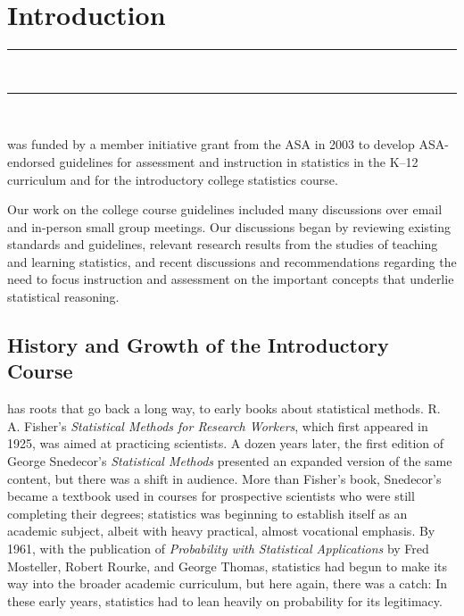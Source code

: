 
\mainmatter
\blankpage

\chapter{Introduction}
\vspace{-.53in}
   \noindent\color{graylight}\rule[0cm]{3.25in}{0.03cm} \\
    \noindent\color{graylight}\rule[0.4cm]{3.25in}{0.03cm} \\
\color{black}
\vspace{.05in}

 was funded by a member initiative grant from the ASA in 2003 to develop ASA-endorsed guidelines for assessment and instruction in statistics in the K--12 curriculum and for the introductory college statistics course.   

Our work on the college course guidelines included many discussions over email and in-person small group meetings.  Our discussions began by reviewing existing standards and guidelines, relevant research results from the studies of teaching and learning statistics, and recent discussions and recommendations regarding the need to focus instruction and assessment on the important concepts that underlie statistical reasoning.

\section{\textbf{History and Growth of the Introductory Course}}
 has roots that go back a long way, to early books about statistical methods.  R. A. Fisher's \textit{Statistical Methods for Research Workers}, which first appeared in 1925, was aimed at practicing scientists.  A dozen years later, the first edition of George Snedecor's \textit{Statistical Methods} presented an expanded version of the same content, but there was a shift in audience.  More than Fisher's book, Snedecor's became a textbook used in courses for prospective scientists who were still completing their degrees; statistics was beginning to establish itself as an academic subject, albeit with heavy practical, almost vocational emphasis.  By 1961, with the publication of \textit{Probability with Statistical Applications} by Fred Mosteller, Robert Rourke, and George Thomas, statistics had begun to make its way into the broader academic curriculum, but here again, there was a catch: In these early years, statistics had to lean heavily on probability for its legitimacy.  

